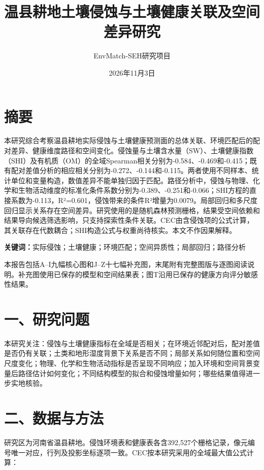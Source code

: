 \documentclass[
  a4paper,
  12pt]{ctexart}
\title{温县耕地土壤侵蚀与土壤健康关联及空间差异研究}
\author{EnvMatch-SEH研究项目}
\date{2026年11月3日}
\let\phasejorigmaketitle\maketitle
\renewcommand{\maketitle}{\phasejorigmaketitle\thispagestyle{empty}\clearpage}
\begin{document}
\maketitle

{
\setcounter{tocdepth}{2}
\tableofcontents
}
\hypertarget{ux6458ux8981}{%
\section{摘要}\label{ux6458ux8981}}

本研究综合考察温县耕地实际侵蚀与土壤健康预测面的总体关联、环境匹配后的配对差异、健康维度路径和空间变化。侵蚀量与土壤含水量（SW）、土壤健康指数（SHI）及有机质（OM）的全域Spearman相关分别为-0.584、-0.469和-0.415；既有配对差值分析的相应相关分别为-0.272、-0.144和-0.115。两者使用不同样本、统计单位和变量构造，数值差异不能单独归因于匹配。路径分析中，侵蚀与物理、化学和生物活动维度的标准化条件系数分别为-0.389、-0.251和-0.066；SHI方程的直接系数为-0.113，R²=0.601，侵蚀带来的条件R²增量为0.0079。局部回归和多尺度回归显示关系存在空间差异。研究使用的是随机森林预测栅格，结果受空间依赖和结果导向候选筛选影响，只支持探索性条件关联。CEC由含侵蚀项的公式计算，其关联存在代数耦合；SHI构造公式与权重尚待核实。本文不作因果解释。

\textbf{关键词：}实际侵蚀；土壤健康；环境匹配；空间异质性；局部回归；路径分析

本报告包括A--I九幅核心图和J--Z十七幅补充图，末尾附有完整图版与逐图阅读说明。补充图使用已保存的模型和空间结果表；图T沿用已保存的健康方向评分敏感性结果。

\hypertarget{ux4e00ux7814ux7a76ux95eeux9898}{%
\section{一、研究问题}\label{ux4e00ux7814ux7a76ux95eeux9898}}

本研究关注：侵蚀与土壤健康指标在全域是否相关；在环境近邻配对后，配对差值是否仍有关联；土类和地形湿度背景下关系是否不同；局部关系如何随位置和空间尺度变化；物理、化学和生物活动指标是否呈现不同响应；加入环境和空间背景变量后路径估计如何变化；不同结构模型的拟合和侵蚀增量如何；哪些结果值得进一步实地核验。

\hypertarget{ux4e8cux6570ux636eux4e0eux65b9ux6cd5}{%
\section{二、数据与方法}\label{ux4e8cux6570ux636eux4e0eux65b9ux6cd5}}

研究区为河南省温县耕地。侵蚀环境表和健康表各含392,527个栅格记录，像元编号唯一对应，行列及投影坐标逐项一致。CEC按本研究采用的全域最大值公式计算：
\end{document}

